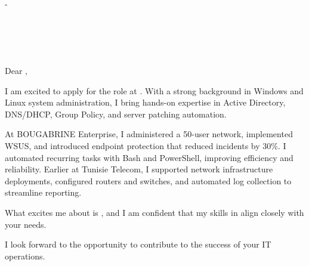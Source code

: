\documentclass[11pt,a4paper]{article}
\begin{document}
\begin{flushright}
    {\textbf{\FullName}} - \JobTitle \\
    \Phone \\
    \href{mailto:\Email}{\Email} \\
    \Location \\
    \LinkedIn \\
    \GitHub
\end{flushright}

Dear \HiringManager,

I am excited to apply for the \JobTitle role at \CompanyName. With a strong background in Windows and Linux system administration, I bring hands-on expertise in Active Directory, DNS/DHCP, Group Policy, and server patching automation.

At BOUGABRINE Enterprise, I administered a 50-user network, implemented WSUS, and introduced endpoint protection that reduced incidents by 30\%. I automated recurring tasks with Bash and PowerShell, improving efficiency and reliability. Earlier at Tunisie Telecom, I supported network infrastructure deployments, configured routers and switches, and automated log collection to streamline reporting.

What excites me about \CompanyName is \YourMotivation, and I am confident that my skills in \JobKeywords align closely with your needs.

I look forward to the opportunity to contribute to the success of your IT operations.

\Signature  
\end{document}
